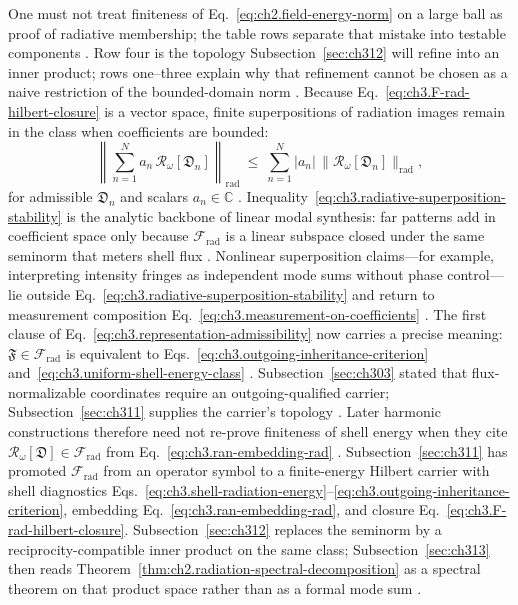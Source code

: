 One must not treat finiteness of Eq.~\eqref{eq:ch2.field-energy-norm} on a large ball as proof of
radiative membership; the table rows separate that mistake into testable components
\cite{harrington2001}. Row four is the topology Subsection~\ref{sec:ch312} will refine into
an inner product; rows one--three explain why that refinement cannot be chosen as a naive restriction of
the bounded-domain norm \cite{stratton1941}.
Because Eq.~\eqref{eq:ch3.F-rad-hilbert-closure} is a vector space, finite superpositions of radiation
images remain in the class when coefficients are bounded:
\begin{equation}
\label{eq:ch3.radiative-superposition-stability}
\left\|\sum_{n=1}^{N} a_n\,\mathcal{R}_\omega[\mathfrak{D}_n]\right\|_{\mathrm{rad}}
\ \le\
\sum_{n=1}^{N}|a_n|\,
\|\mathcal{R}_\omega[\mathfrak{D}_n]\|_{\mathrm{rad}},
\end{equation}
for admissible \(\mathfrak{D}_n\) and scalars \(a_n\in\mathbb{C}\) \cite{stratton1941}.
Inequality~\eqref{eq:ch3.radiative-superposition-stability} is the analytic backbone of linear modal
synthesis: far patterns add in coefficient space only because \(\mathcal{F}_{\mathrm{rad}}\) is a linear
subspace closed under the same seminorm that meters shell flux \cite{stratton1941}. Nonlinear superposition
claims---for example, interpreting intensity fringes as independent mode sums without phase control---lie
outside Eq.~\eqref{eq:ch3.radiative-superposition-stability} and return to measurement composition
Eq.~\eqref{eq:ch3.measurement-on-coefficients} \cite{harrington2001}.
The first clause of Eq.~\eqref{eq:ch3.representation-admissibility} now carries a precise meaning:
\(\mathfrak{F}\in\mathcal{F}_{\mathrm{rad}}\) is equivalent to
Eqs.~\eqref{eq:ch3.outgoing-inheritance-criterion} and~\eqref{eq:ch3.uniform-shell-energy-class}
\cite{stratton1941}. Subsection~\ref{sec:ch303} stated that flux-normalizable coordinates require an
outgoing-qualified carrier; Subsection~\ref{sec:ch311} supplies the carrier's topology
\cite{harrington2001}. Later harmonic constructions therefore need not re-prove finiteness of shell
energy when they cite \(\mathcal{R}_\omega[\mathfrak{D}]\in\mathcal{F}_{\mathrm{rad}}\) from
Eq.~\eqref{eq:ch3.ran-embedding-rad} \cite{stratton1941}.
Subsection~\ref{sec:ch311} has promoted \(\mathcal{F}_{\mathrm{rad}}\) from an operator symbol to a
finite-energy Hilbert carrier with shell diagnostics Eqs.~\eqref{eq:ch3.shell-radiation-energy}--\eqref{eq:ch3.outgoing-inheritance-criterion},
embedding Eq.~\eqref{eq:ch3.ran-embedding-rad}, and closure
Eq.~\eqref{eq:ch3.F-rad-hilbert-closure}. Subsection~\ref{sec:ch312} replaces the seminorm by a
reciprocity-compatible inner product on the same class; Subsection~\ref{sec:ch313} then reads
Theorem~\ref{thm:ch2.radiation-spectral-decomposition} as a spectral theorem on that product space rather
than as a formal mode sum \cite{stratton1941}.
